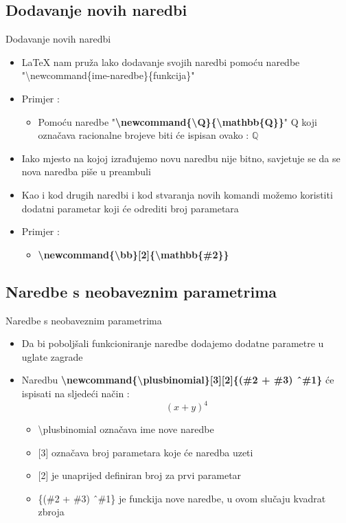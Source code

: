 \documentclass{beamer}
\newcommand{\plusbinomial}[3][2]{(#2 + #3) ^ #1}
\begin{document}
\subsection{Dodavanje novih naredbi}

\begin{frame}[t]{Dodavanje novih naredbi}
\begin{itemize}
	\item LaTeX nam pruža lako dodavanje svojih naredbi pomoću naredbe "\textbackslash newcommand\{ime-naredbe\}\{funkcija\}"
	\item Primjer :
	\begin{itemize}
		\newcommand{\Q}{\mathbb{Q}} 
		\item Pomoću naredbe "\textbf{\textbackslash newcommand\{\textbackslash Q\}\{\textbackslash mathbb\{Q\}\}}" Q koji označava racionalne brojeve biti će ispisan ovako : \( \Q \)
	\end{itemize}
	\item Iako mjesto na kojoj izrađujemo novu naredbu nije bitno, savjetuje se da se nova naredba piše u preambuli	 
	\item Kao i kod drugih naredbi i kod stvaranja novih komandi možemo koristiti dodatni parametar koji će odrediti broj parametara 
	\item Primjer :
		\begin{itemize}
			\item \textbf{\textbackslash newcommand\{\textbackslash bb\}{[}2{]}\{\textbackslash mathbb\{\#2\}\}}
		\end{itemize}	
\end{itemize}	
\end{frame}

\subsection{Naredbe s neobaveznim parametrima}

\begin{frame}[t]{Naredbe s neobaveznim parametrima}
\begin{itemize}
	\item Da bi poboljšali funkcioniranje naredbe dodajemo dodatne parametre u uglate zagrade
		\item Naredbu \textbf{\textbackslash newcommand\{\textbackslash plusbinomial\}{[}3{]}{[}2{]}\{(\#2 + \#3) \^\ \#1\}} će ispisati na sljedeći način :
				\[ \plusbinomial[4]{x}{y} \]
		\begin{itemize}
			\item \textbackslash plusbinomial označava ime nove naredbe		
			\item {[}3{]} označava broj parametara koje će naredba uzeti
			\item {[}2{]} je unaprijed definiran broj za prvi parametar
			\item  \{(\#2 + \#3) \^\ \#1\} je funckija nove naredbe, u ovom slučaju kvadrat zbroja
		\end{itemize}
\end{itemize}	
\end{frame}
\end{document}
